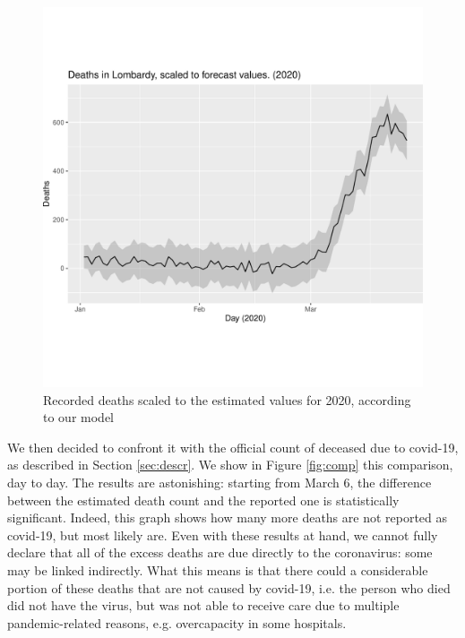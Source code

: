 \documentclass[11pt,a4paper,final]{paper}
\begin{document}
\begin{figure}[h]
\includegraphics[width=\textwidth]{../images/lombardy_clean.pdf}
\caption{Recorded deaths scaled to the estimated values for 2020, according to our model}
\label{fig:lomb_clean}
\end{figure}

We then decided to confront it with the official count of deceased due to covid-19, as described in Section \ref{sec:descr}. We show in Figure \ref{fig:comp} this comparison, day to day. The results are astonishing: starting from March 6, the difference between the estimated death count and the reported one is statistically significant. Indeed, this graph shows how many more deaths are not reported as covid-19, but most likely are. Even with these results at hand, we cannot fully declare that all of the excess deaths are due directly to the coronavirus: some may be linked indirectly. What this means is that there could a considerable portion of these deaths that are not caused by covid-19, i.e. the person who died did not have the virus, but was not able to receive care due to multiple pandemic-related reasons, e.g. overcapacity in some hospitals.
\end{document}
